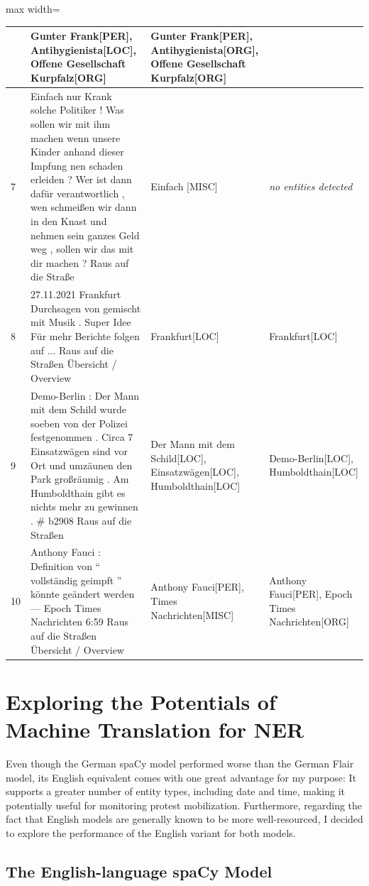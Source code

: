 \begin{table}[htp]
\begin{adjustbox}{max width=\textwidth}
\begin{tabular}{|p{0.04\linewidth}|p{0.55\linewidth}|p{0.36\linewidth}|p{0.3\linewidth}|}
& Gunter Frank[PER], Antihygienista[LOC], Offene Gesellschaft Kurpfalz[ORG] 
& Gunter Frank[PER], Antihygienista[ORG], Offene Gesellschaft Kurpfalz[ORG]\\ 
\hline
7 
& Einfach nur Krank solche Politiker ! Was sollen wir mit ihm machen wenn unsere Kinder anhand dieser Impfung nen schaden erleiden ? Wer ist dann dafür verantwortlich , wen schmeißen wir dann in den Knast und nehmen sein ganzes Geld weg , sollen wir das mit dir machen ? Raus auf die Straße 
& Einfach [MISC]
& \textit{no entities detected}\\ 
\hline
8 
& 27.11.2021 Frankfurt Durchsagen von gemischt mit Musik . Super Idee   Für mehr Berichte folgen auf ... Raus auf die Straßen   \"Ubersicht / Overview 
& Frankfurt[LOC]
& Frankfurt[LOC]\\ 
\hline
9 
& Demo-Berlin : Der Mann mit dem Schild wurde soeben von der Polizei festgenommen . Circa 7 Einsatzwägen sind vor Ort und umzäunen den Park großräumig . Am Humboldthain gibt es nichts mehr zu gewinnen . \# b2908 Raus auf die Straßen 
& Der Mann mit dem Schild[LOC], Einsatzwägen[LOC], Humboldthain[LOC]
& Demo-Berlin[LOC], Humboldthain[LOC]\\ 
\hline
10 
& Anthony Fauci : Definition von `` vollständig geimpft '' könnte geändert werden — Epoch Times Nachrichten 6:59 Raus auf die Straßen   \"Ubersicht / Overview 
& Anthony Fauci[PER], Times Nachrichten[MISC]
& Anthony Fauci[PER], Epoch Times Nachrichten[ORG]

\end{tabular}
\end{adjustbox}
\end{table}

\section{Exploring the Potentials of Machine Translation for NER}

Even though the German spaCy model performed worse than the German Flair model, its English equivalent comes with one great advantage for my purpose: It supports a greater number of entity types, including date and time, making it potentially useful for monitoring protest mobilization. Furthermore, regarding the fact that English models are generally known to be more well-resourced, I decided to explore the performance of the English variant for both models. 

\subsection{The English-language spaCy Model}

